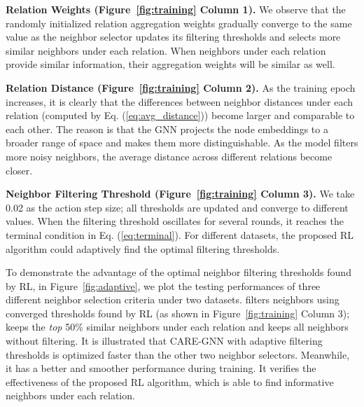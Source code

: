 \vspace{1mm}
\noindent \textbf{Relation Weights (Figure~\ref{fig:training} Column 1).}
We observe that the randomly initialized relation aggregation weights gradually converge to the same value as the neighbor selector updates its filtering thresholds and selects more similar neighbors under each relation.
When neighbors under each relation provide similar information, their aggregation weights will be similar as well.


\vspace{1mm}
\noindent \textbf{Relation Distance (Figure~\ref{fig:training} Column 2).}
As the training epoch increases, it is clearly that the differences between neighbor distances under each relation (computed by Eq. (\ref{eq:avg_distance})) become larger and comparable to each other.
The reason is that the GNN projects the node embeddings to a broader range of space and makes them more distinguishable.
As the model filters more noisy neighbors, the average distance across different relations become closer.

\vspace{1mm}
\noindent \textbf{Neighbor Filtering Threshold (Figure~\ref{fig:training} Column 3).}
We take 0.02 as the action step size; all thresholds are updated and converge to different values.
When the filtering threshold oscillates for several rounds, it reaches the terminal condition in Eq. (\ref{eq:terminal}).
For different datasets, the proposed RL algorithm could adaptively find the optimal filtering thresholds.

To demonstrate the advantage of the optimal neighbor filtering thresholds found by RL, in Figure~\ref{fig:adaptive}, we plot the testing performances of three different neighbor selection criteria under two datasets. 
 filters neighbors using converged thresholds found by RL (as shown in Figure~\ref{fig:training} Column 3);  keeps the \textit{top} 50\% similar neighbors under each relation and  keeps all neighbors without filtering.   
It is illustrated that CARE-GNN with adaptive filtering thresholds is optimized faster than the other two neighbor selectors.
Meanwhile, it has a better and smoother performance during training. 
It verifies the effectiveness of the proposed RL algorithm, which is able to find informative neighbors under each relation.


























